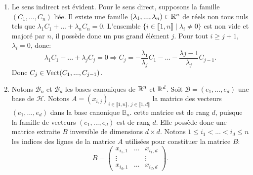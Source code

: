 \begin{enumerate}
 \item Le sens indirect est évident. Pour le sens direct, supposons la famille $(C_{1}, ..., C_{n})$ liée. Il existe une famille $(\lambda_{1}, ..., \lambda_{n})\in \mathbb{R}^{n}$ de réels non tous nuls tels que 
 $\lambda_{1}C_{1} + ... + \lambda_{n}C_{n} = 0$. L'ensemble $\{ i\in \llbracket 1, n\rrbracket \mid \lambda_{i} \neq 0\}$ est non vide et majoré par $n$, il possède donc un pus grand élément $j$. Pour tout $i\geq j+1$, $\lambda_{i} = 0$, donc:
 \[ \lambda_{1}C_{1} + ... + \lambda_{j}C_{j} = 0 \Longrightarrow C_{j} = - \frac{\lambda_{1}}{\lambda_{j}}C_{1} - ... - \frac{\lambda{j-1}}{\lambda_{j}}C_{j-1}.\]
 Donc $C_{j} \in \operatorname{Vect}(C_{1}, ..., C_{j-1})$. 
 
 
 
 
 \item Notons $\mathcal{B}_{n}$ et $\mathcal{B}_{d}$ les bases canoniques de $\mathbb{R}^{n}$ et $\mathbb{R}^{d}$. Soit $\mathcal{B} = (e_{1}, ..., e_{d})$ une base de $\mathcal{H}$. Notons 
 $A = (x_{i,j})_{i\in \llbracket 1, n\rrbracket,\ j\in \llbracket 1, d\rrbracket}$ la matrice des vecteurs $(e_{1}, ..., e_{d})$ dans la base canonique $\mathbb{B}_{n}$. cette matrice est de rang $d$, puisque la famille de vecteurs
 $(e_{1}, ..., e_{d})$ est de rang $d$. Elle possède donc une matrice extraite $B$ inversible de dimensions $d\times d$. Notons $1\leq i_{1} < ... < i_{d} \leq n$ les indices des lignes de la matrice $A$ utilisées pour constituer la matrice $B$:
 \[B = \begin{pmatrix}
        x_{i_{1},1} & \hdots & x_{i_{1}, d}\\
        \vdots  & & \vdots \\
        x_{i_{d}, 1} & \hdots & x_{i_{d}, d}
       \end{pmatrix}.\]
 

\end{enumerate}
